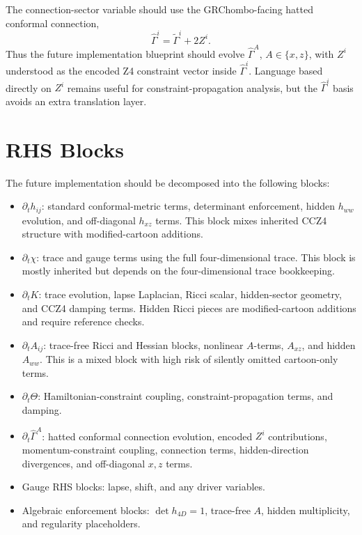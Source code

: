 \documentclass[11pt]{article}
\begin{document}
The connection-sector variable should use the GRChombo-facing hatted
conformal connection,
\[
  \hat{\Gamma}^i
  =
  \tilde{\Gamma}^i+2Z^i.
\]
Thus the future implementation blueprint should evolve
\(\hat{\Gamma}^A\), \(A\in\{x,z\}\), with \(Z^i\) understood as the encoded
Z4 constraint vector inside \(\hat{\Gamma}^i\). Language based directly on
\(Z^i\) remains useful for constraint-propagation analysis, but the
\(\hat{\Gamma}^i\) basis avoids an extra translation layer.

\section{RHS Blocks}

The future implementation should be decomposed into the following blocks:
\begin{itemize}
  \item \(\partial_t h_{ij}\): standard conformal-metric terms, determinant
  enforcement, hidden \(h_{ww}\) evolution, and off-diagonal \(h_{xz}\) terms.
  This block mixes inherited CCZ4 structure with modified-cartoon additions.
  \item \(\partial_t\chi\): trace and gauge terms using the full
  four-dimensional trace. This block is mostly inherited but depends on the
  four-dimensional trace bookkeeping.
  \item \(\partial_t K\): trace evolution, lapse Laplacian, Ricci scalar,
  hidden-sector geometry, and CCZ4 damping terms. Hidden Ricci pieces are
  modified-cartoon additions and require reference checks.
  \item \(\partial_t A_{ij}\): trace-free Ricci and Hessian blocks, nonlinear
  \(A\)-terms, \(A_{xz}\), and hidden \(A_{ww}\). This is a mixed block with
  high risk of silently omitted cartoon-only terms.
  \item \(\partial_t\Theta\): Hamiltonian-constraint coupling,
  constraint-propagation terms, and damping.
  \item \(\partial_t\hat{\Gamma}^A\): hatted conformal connection evolution,
  encoded \(Z^i\) contributions, momentum-constraint coupling, connection
  terms, hidden-direction divergences, and off-diagonal \(x,z\) terms.
  \item Gauge RHS blocks: lapse, shift, and any driver variables.
  \item Algebraic enforcement blocks: \(\det h_{4D}=1\), trace-free \(A\),
  hidden multiplicity, and regularity placeholders.
\end{itemize}
\end{document}
